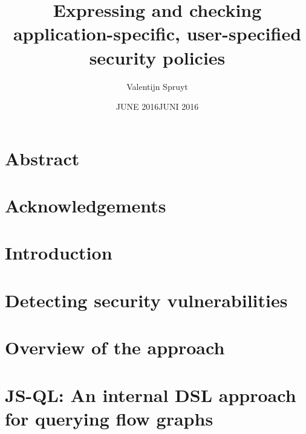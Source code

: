 \documentclass[a4paper, 12pt]{report}
\author{Valentijn Spruyt}
\title{Expressing and checking application-specific, user-specified security policies}
\date{JUNE 2016}
\begin{document}
\maketitlepage
 
 
\date{JUNI 2016}
 
\maketitlepage


\chapter*{Abstract}
 
 
 
\chapter*{Acknowledgements}
 
\tableofcontents



\chapter{Introduction}


\chapter{Detecting security vulnerabilities}

 
\chapter{Overview of the approach}
\label{ch:Overview}


\chapter{JS-QL: An internal DSL approach for querying flow graphs}
\label{ch:JSQL}

 
\end{document}
